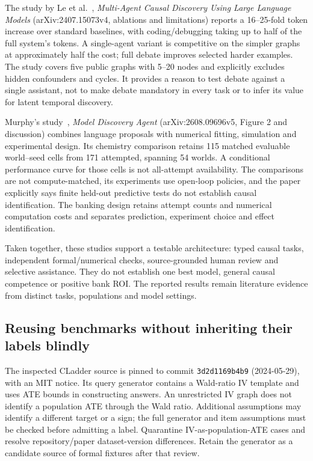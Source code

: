The study by Le et al.~\citep{v12_la_2407_15073}, \emph{Multi-Agent
Causal Discovery Using Large Language Models} (arXiv:2407.15073v4,
ablations and limitations) reports a 16--25-fold token increase over
standard baselines, with coding/debugging taking up to half of the full
system's tokens. A single-agent variant is competitive on the simpler
graphs at approximately half the cost; full debate improves selected
harder examples. The study covers five public graphs with 5--20 nodes
and explicitly excludes hidden confounders and cycles. It provides a
reason to test debate against a single assistant, not to make debate
mandatory in every task or to infer its value for latent temporal
discovery.

Murphy's study~\citep{v12_la_2608_09696}, \emph{Model
Discovery Agent} (arXiv:2608.09696v5, Figure 2 and discussion) combines
language proposals with numerical fitting, simulation and experimental
design. Its chemistry comparison retains 115 matched evaluable
world--seed cells from 171 attempted, spanning 54 worlds. A conditional
performance curve for those cells is not all-attempt availability. The
comparisons are not compute-matched, its experiments use open-loop
policies, and the paper explicitly says finite held-out predictive tests
do not establish causal identification. The banking design retains
attempt counts and numerical computation costs and separates prediction,
experiment choice and effect identification.

Taken together, these studies support a testable architecture: typed
causal tasks, independent formal/numerical checks, source-grounded human
review and selective assistance. They do not establish one best model,
general causal competence or positive bank ROI. The reported results
remain literature evidence from distinct tasks, populations and model
settings.

\hypertarget{reusing-benchmarks-without-inheriting-their-labels-blindly}{%
\subsection{Reusing benchmarks without inheriting their labels
blindly}\label{reusing-benchmarks-without-inheriting-their-labels-blindly}}

The inspected CLadder source is pinned to commit \texttt{3d2d1169b4b9}
(2024-05-29), with an MIT notice. Its query generator contains a
Wald-ratio IV template and uses ATE bounds in constructing answers. An
unrestricted IV graph does not identify a population ATE through the
Wald ratio. Additional assumptions may identify a different target or a
sign; the full generator and item assumptions must be checked before
admitting a label. Quarantine IV-as-population-ATE cases and resolve
repository/paper dataset-version differences. Retain the generator as a
candidate source of formal fixtures after that review.

